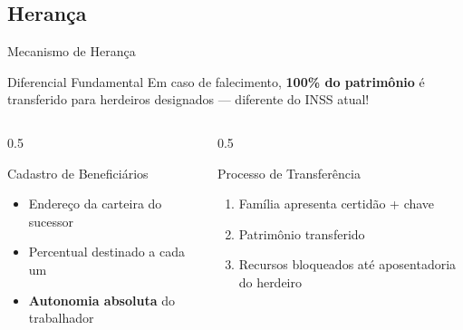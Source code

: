 \documentclass{libs/ufc_format}
\begin{document}
\subsection{Herança}
\begin{frame}{Mecanismo de Herança}
    \begin{alertblock}{Diferencial Fundamental}
        Em caso de falecimento, \textbf{100\% do patrimônio} é transferido para herdeiros designados --- diferente do INSS atual!
    \end{alertblock}
    
    \vspace{0.3cm}
    
    \begin{columns}
        \begin{column}{0.5\textwidth}
            \begin{block}{Cadastro de Beneficiários}
                \begin{itemize}
                    \item Endereço da carteira do sucessor
                    \item Percentual destinado a cada um
                    \item \textbf{Autonomia absoluta} do trabalhador
                \end{itemize}
            \end{block}
        \end{column}
        \begin{column}{0.5\textwidth}
            \begin{block}{Processo de Transferência}
                \begin{enumerate}
                    \item Família apresenta certidão + chave
                    \item Patrimônio transferido
                    \item Recursos bloqueados até aposentadoria do herdeiro
                \end{enumerate}
            \end{block}
        \end{column}
    \end{columns}
\end{frame}

\end{document}
